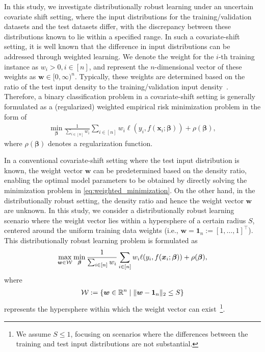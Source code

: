 In this study, we investigate distributionally robust learning under an uncertain covariate shift setting, where the input distributions for the training/validation datasets and the test datasets differ, with the discrepancy between these distributions known to lie within a specified range.
%
In such a covariate-shift setting, it is well known that the difference in input distributions can be addressed through weighted learning.  
%
We denote the weight for the $i$-th training instance as $w_i > 0, i \in [n]$, and represent the $n$-dimensional vector of these weights as $\bm{w} \in [0, \infty)^n$.  
%
Typically, these weights are determined based on the ratio of the test input density to the training/validation input density~\citep{shimodaira2000improving, sugiyama2007covariate}.  
%
Therefore, a binary classification problem in a covariate-shift setting is generally formulated as a (regularized) weighted empirical risk minimization problem in the form of  
\begin{align}  
\label{eq:weighted_minimization}  
\min_{\bm \beta} {\frac{1}{\sum_{i \in [n]} w_i}} \sum_{i \in [n]} w_i \ell(y_i, f(\bm x_i; \bm \beta)) + \rho(\bm \beta),  
\end{align}  
where $\rho(\bm \beta)$ denotes a regularization function.  

In a conventional covariate-shift setting where the test input distribution is known, the weight vector $\bm{w}$ can be predetermined based on the density ratio, enabling the optimal model parameters to be obtained by directly solving the minimization problem in \eqref{eq:weighted_minimization}.
%
On the other hand, in the distributionally robust setting, the density ratio and hence the weight vector $\bm w$ are unknown.
%
In this study, we consider a distributionally robust learning scenario where the weight vector lies within a hypersphere of a certain radius $S$, centered around the uniform training data weights (i.e., $ \bm w = \bm{1}_n := [1, \ldots, 1]^\top $).
%
This distributionally robust learning problem is formulated as  
\begin{align}  
\max_{\bm{w} \in {\mathcal W}} \min_{\bm{\beta}} {\frac{1}{\sum_{i \in [n]} w_i}} \sum_{i \in [n]} w_i \ell(y_i, f(\bm{x}_i; \bm{\beta})) + \rho(\bm{\beta}),  
\end{align}  
where  
\begin{align}  
{\mathcal W} := \{\bm{w} \in \mathbb{R}^n \mid \| \bm{w} - \bm{1}_{n} \|_2 \le S\} \label{eq:weight-changes-distrib}
\end{align}  
represents the hypersphere within which the weight vector can exist~\footnote{  
We assume $S \leq 1$, focusing on scenarios where the differences between the training and test input distributions are not substantial.  
}.  


